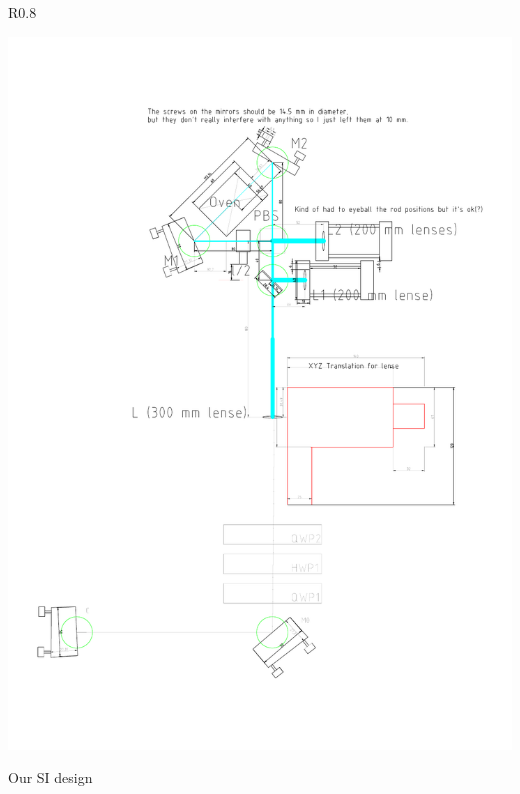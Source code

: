 \begin{warpfigure}{R}{0.8\textwidth}
\begin{center}
	\includegraphics[scale=0.4]{Sagnac_Larger_300mm_Lens.pdf}
\end{center}
\caption{Our SI design}
\label{fig:SI}
\end{warpfigure}

